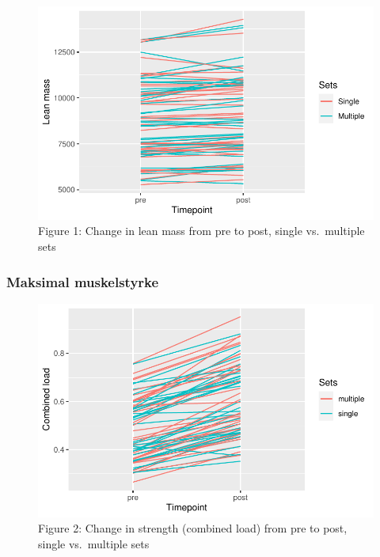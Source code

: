 \documentclass[
  letterpaper,
  DIV=11,
  numbers=noendperiod]{scrartcl}
\begin{document}
\begin{figure}

{\centering \includegraphics{Assignment-5-_files/figure-pdf/unnamed-chunk-1-1.pdf}

}

\caption{Figure 1: Change in lean mass from pre to post, single
vs.~multiple sets}

\end{figure}

\hypertarget{maksimal-muskelstyrke}{%
\subsubsection{Maksimal muskelstyrke}\label{maksimal-muskelstyrke}}

\begin{figure}

{\centering \includegraphics{Assignment-5-_files/figure-pdf/unnamed-chunk-3-1.pdf}

}

\caption{Figure 2: Change in strength (combined load) from pre to post,
single vs.~multiple sets}

\end{figure}
\end{document}

